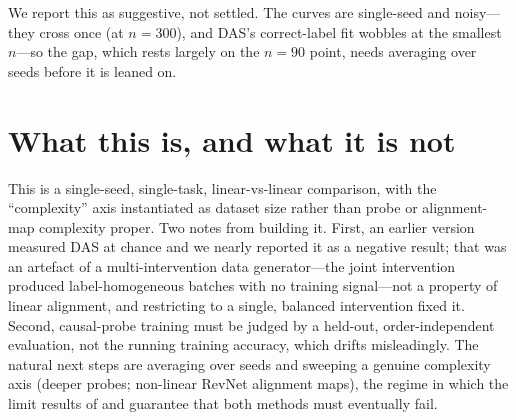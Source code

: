 \documentclass[11pt]{article}
\begin{document}
We report this as suggestive, not settled. The curves are single-seed and noisy---they
cross once (at $n=300$), and DAS's correct-label fit wobbles at the smallest $n$---so the
gap, which rests largely on the $n=90$ point, needs averaging over seeds before it is
leaned on.

\section*{What this is, and what it is not}

This is a single-seed, single-task, linear-vs-linear comparison, with the ``complexity''
axis instantiated as dataset size rather than probe or alignment-map complexity proper.
Two notes from building it. First, an earlier version measured DAS at chance and we
nearly reported it as a negative result; that was an artefact of a multi-intervention
data generator---the joint intervention produced label-homogeneous batches with no
training signal---not a property of linear alignment, and restricting to a single,
balanced intervention fixed it. Second, causal-probe training must be judged by a
held-out, order-independent evaluation, not the running training accuracy, which drifts
misleadingly. The natural next steps are averaging over seeds and sweeping a genuine
complexity axis (deeper probes; non-linear RevNet alignment maps), the regime in which
the limit results of \citet{pimentel2020information} and \citet{sutter2025nonlinear}
guarantee that both methods must eventually fail.

\small


\end{document}
